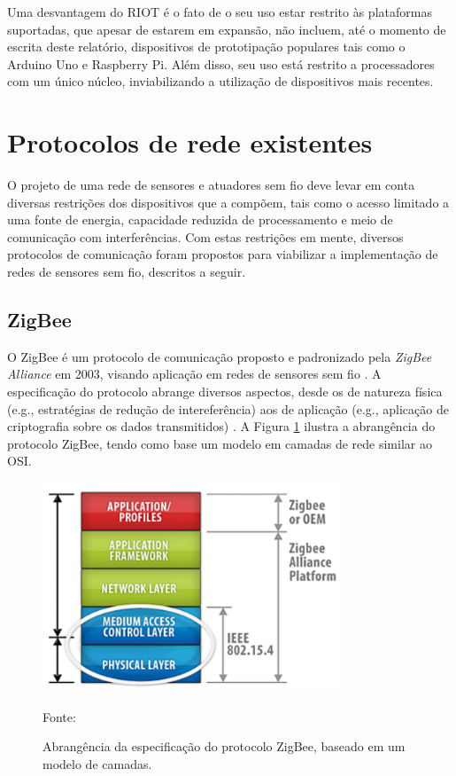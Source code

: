 Uma desvantagem do RIOT é o fato de o seu uso estar restrito às plataformas suportadas, que apesar de estarem em expansão, não incluem, até o momento de escrita deste relatório, dispositivos de prototipação populares tais como o Arduino Uno e Raspberry Pi. Além disso, seu uso está restrito a processadores com um único núcleo, inviabilizando a utilização de dispositivos mais recentes. 
 
\section{Protocolos de rede existentes}\label{sec:commprot}
O projeto de uma rede de sensores e atuadores sem fio deve levar em conta diversas restrições dos dispositivos que a compõem, tais como o acesso limitado a uma fonte de energia, capacidade reduzida de processamento e meio de comunicação com interferências. Com estas restrições em mente, diversos protocolos de comunicação foram propostos para viabilizar a implementação de redes de sensores sem fio, descritos a seguir.

\subsection{ZigBee}
O ZigBee é um protocolo de comunicação proposto e padronizado pela \textit{ZigBee Alliance} em 2003, visando aplicação em redes de sensores sem fio \cite{zigbeealliance}. A especificação do protocolo abrange diversos aspectos, desde os de natureza física (e.g., estratégias de redução de intereferência) aos de aplicação (e.g., aplicação de criptografia sobre os dados transmitidos) \cite{stevanovic2007}. A Figura \ref{fig:zigbee} ilustra a abrangência do protocolo ZigBee, tendo como base um modelo em camadas de rede similar ao OSI.

\begin{figure}[h]
	\centering
	\caption{Abrangência da especificação do protocolo ZigBee, baseado em um modelo de camadas.}
  \includegraphics[width=0.8\textwidth]{imagens/zigbee.png}
  \label{fig:zigbee}
  
  Fonte: \cite{stevanovic2007}
\end{figure}

